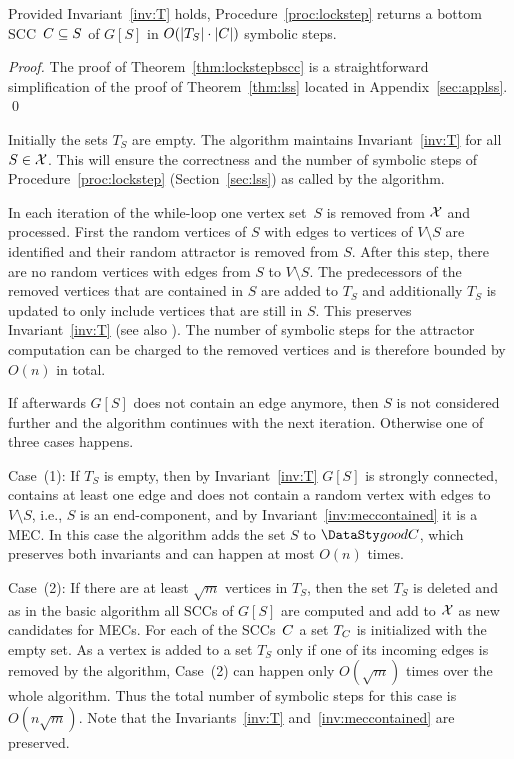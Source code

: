 {
\begin{thm}\label{thm:lockstepbscc}
	Provided Invariant~\ref{inv:T} holds, 
	Procedure~\ref{proc:lockstep}
	returns a bottom SCC~$C \subseteq S$ of
	$G[S]$ in $O(\lvert T_S \rvert \cdot \lvert C \rvert)$ symbolic steps.
\end{thm}

\begin{proof}
The proof of Theorem~\ref{thm:lockstepbscc} is a straightforward
simplification of the proof of Theorem~\ref{thm:lss} located in Appendix~\ref{sec:applss}.
\qed
\end{proof}
}

Initially the sets $T_S$ are empty.
The algorithm maintains Invariant~\ref{inv:T} for 
all $S \in \mathcal{X}$. 
This will ensure the correctness and the number of symbolic steps
of Procedure~\ref{proc:lockstep} (Section~\ref{sec:lss}) as called by the algorithm.

In each iteration of the while-loop one vertex set~$S$ is removed from $\mathcal{X}$ 
and processed. First the random vertices of $S$
with edges to vertices of $V \setminus S$ are identified and their random attractor
is removed from $S$.
After this step, there are no random vertices with edges 
from $S$ to $V \setminus S$. The predecessors of the removed vertices that are contained
in $S$ are added to $T_S$ and additionally $T_S$ is updated to only include 
vertices that are still in $S$. This preserves Invariant~\ref{inv:T} (see also 
\cite[Lemma 4.5.2]{Loitzenbauer16}).  The number of symbolic steps for the 
attractor computation can be charged to the removed vertices and is therefore bounded 
by $O(n)$ in total.

If afterwards $G[S]$ does not contain an edge anymore, 
then $S$ is not considered further and the algorithm continues with
the next iteration. Otherwise one of three cases happens.

\smallskip\noindent Case~(1): If $T_S$ is empty,
then by Invariant~\ref{inv:T} $G[S]$ is strongly connected, contains at least one 
edge and does not contain a random vertex with edges to $V \setminus S$, i.e.,
$S$ is an end-component, and by Invariant~\ref{inv:meccontained} it is a MEC.
In this case the algorithm adds the set $S$ to $\goodC$, which preserves 
both invariants and can happen at most $O(n)$ times.

\smallskip\noindent Case~(2): If there 
are at least $\sqrt{m}$ vertices in $T_S$, then the set $T_S$ is deleted and
as in the basic algorithm all SCCs of $G[S]$ are computed and add to $\mathcal{X}$
as new candidates for MECs. For each of the SCCs~$C$ a set $T_C$ is 
initialized with the empty set. As a vertex is added to a set $T_S$ only if one 
of its incoming edges is removed by the algorithm, Case~(2) can happen only $O(\sqrt{m})$
times over the whole algorithm. Thus the total number of symbolic steps 
for this case is $O(n \sqrt{m})$. Note that the Invariants~\ref{inv:T} 
and~\ref{inv:meccontained} are preserved.

